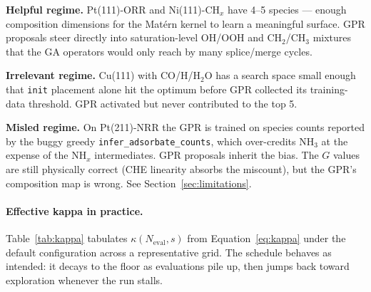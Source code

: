 \documentclass[11pt,letterpaper]{article}
\begin{document}
\noindent\begin{tcolorbox}[colback=lightgreen, colframe=sciencegreen,
  fonttitle=\bfseries\color{white}, title=Three observed GPR regimes,
  coltitle=white, colbacktitle=sciencegreen,
  boxrule=1pt, arc=3pt, left=8pt, right=8pt, top=6pt, bottom=6pt,
  before skip=12pt, after skip=12pt,
  grow to left by=0pt, grow to right by=0pt]
\sloppy\small
\textbf{Helpful regime.} Pt(111)-ORR and Ni(111)-CH$_x$ have 4--5
species — enough composition dimensions for the Mat{\'e}rn kernel to
learn a meaningful surface. GPR proposals steer directly into
saturation-level OH/OOH and CH$_2$/CH$_3$ mixtures that the GA
operators would only reach by many splice/merge cycles.

\medskip\noindent
\textbf{Irrelevant regime.} Cu(111) with CO/H/H$_2$O has a search
space small enough that \texttt{init} placement alone hit the optimum
before GPR collected its training-data threshold. GPR activated but
never contributed to the top 5.

\medskip\noindent
\textbf{Misled regime.} On Pt(211)-NRR the GPR is trained on species
counts reported by the buggy greedy \texttt{infer\_adsorbate\_counts},
which over-credits NH$_3$ at the expense of the NH$_x$ intermediates.
GPR proposals inherit the bias. The $G$ values are still physically
correct (CHE linearity absorbs the miscount), but the GPR's
composition map is wrong. See Section~\ref{sec:limitations}.
\end{tcolorbox}

\paragraph{Effective kappa in practice.}
Table~\ref{tab:kappa} tabulates $\kappa(N_{\text{eval}}, s)$ from
Equation~\ref{eq:kappa} under the default configuration across a
representative grid. The schedule behaves as intended: it decays to
the floor as evaluations pile up, then jumps back toward exploration
whenever the run stalls.
\end{document}

